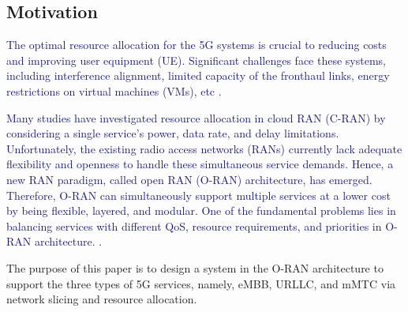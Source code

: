 \documentclass[lettersize,journal]{IEEEtran}
\begin{document}
\subsection{Motivation}
\textcolor{MidnightBlue}{The optimal resource allocation for the 5G systems is crucial to reducing costs and improving user equipment (UE). Significant challenges face these systems, including interference alignment, limited capacity of the fronthaul links, energy restrictions on virtual machines (VMs), etc }\cite{lee2018dynamic,SystemCostMinimization, setayesh2020joint}.

\textcolor{MidnightBlue}{Many studies have investigated resource allocation in cloud RAN (C-RAN) by considering a single service's power, data rate, and delay limitations.}
\textcolor{MidnightBlue}{Unfortunately, the existing radio access networks (RANs) currently lack adequate flexibility and openness to handle these simultaneous service demands. 
Hence, a new RAN paradigm, called open RAN (O-RAN) architecture, has emerged.
Therefore, O-RAN can simultaneously support multiple services at a lower cost by being flexible, layered, and modular.  
One of the fundamental problems lies in balancing services with different QoS, resource requirements, and priorities in O-RAN architecture.}
 \cite{ORANArch, gavrilovska2020cloud, kazemifard2021minimum, shen2020ai}.  

The purpose of this paper is to design a system in the O-RAN architecture to support the three types of 5G services, namely, eMBB, URLLC, and mMTC via network slicing and resource allocation.
\end{document}
